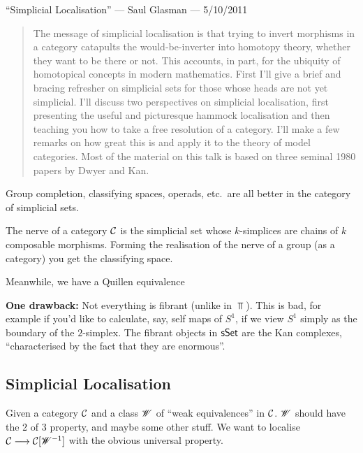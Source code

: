 \begin{SaulSimplicialLocalisation}
\KanSemResponse
{``Simplicial Localisation'' --- Saul Glasman --- 5/10/2011}
\begin{abstract}
The message of simplicial localisation is that trying to invert 
morphisms in a category catapults the would-be-inverter into homotopy 
theory, whether they want to be there or not. This accounts, in part, 
for the ubiquity of homotopical concepts in modern mathematics. First 
I'll give a brief and bracing refresher on simplicial sets for those 
whose heads are not yet simplicial. I'll discuss two perspectives on 
simplicial localisation, first presenting the useful and picturesque 
hammock localisation and then teaching you how to take a free resolution 
of a category. I'll make a few remarks on how great this is and apply it 
to the theory of model categories. Most of the material on this talk is 
based on three seminal 1980 papers by Dwyer and Kan.
\end{abstract}
Group completion, classifying spaces, operads, etc.\ are all better in the category of simplicial sets. 
\begin{exmp*}
The nerve of a category $\mathcal{C}$ is the simplicial set whose $k$-simplices are chains of $k$ composable morphisms. Forming the realisation of the nerve of a group (as a category) you get the classifying space.
\end{exmp*}
Meanwhile, we have a Quillen equivalence 

\noindent \textbf{One drawback:} Not everything is fibrant (unlike in $\Top$).
This is bad, for example if you'd like to calculate, say, self maps of $S^1$, if we view $S^1$ simply as the boundary of the $2$-simplex.
The fibrant objects in $\operatorname{{\mathsf{sSet}}}$ are the Kan complexes, ``characterised by the fact that they are enormous''.
\subsection*{Simplicial Localisation}
Given a category $\mathcal{C}$ and a class $\mathscr{W}$ of ``weak equivalences'' in $\mathcal{C}$. $\mathscr{W}$ should have the 2 of 3 property, and maybe some other stuff. We want to localise $\mathcal{C}\longrightarrow\mathcal{C}[\mathscr{W}^{-1}]$ with the obvious universal property.


\end{SaulSimplicialLocalisation}
